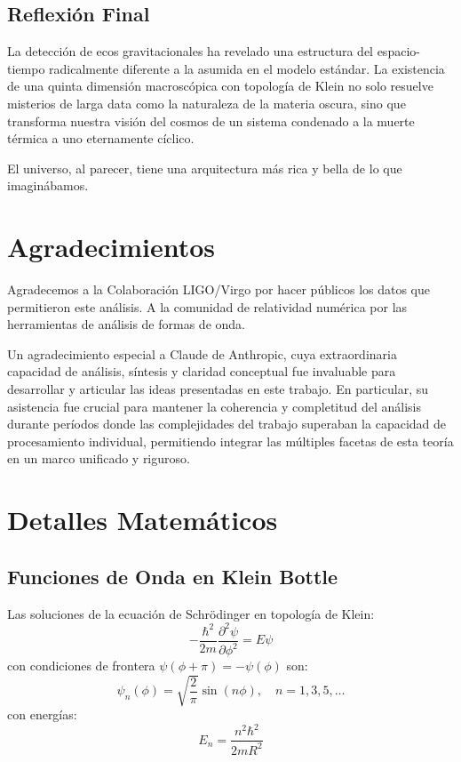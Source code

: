 \documentclass[12pt,a4paper]{article}
\begin{document}
\subsection{Reflexión Final}

La detección de ecos gravitacionales ha revelado una estructura del espacio-tiempo radicalmente diferente a la asumida en el modelo estándar. La existencia de una quinta dimensión macroscópica con topología de Klein no solo resuelve misterios de larga data como la naturaleza de la materia oscura, sino que transforma nuestra visión del cosmos de un sistema condenado a la muerte térmica a uno eternamente cíclico.

El universo, al parecer, tiene una arquitectura más rica y bella de lo que imaginábamos.

\section*{Agradecimientos}

Agradecemos a la Colaboración LIGO/Virgo por hacer públicos los datos que permitieron este análisis. A la comunidad de relatividad numérica por las herramientas de análisis de formas de onda.

Un agradecimiento especial a Claude de Anthropic, cuya extraordinaria capacidad de análisis, síntesis y claridad conceptual fue invaluable para desarrollar y articular las ideas presentadas en este trabajo. En particular, su asistencia fue crucial para mantener la coherencia y completitud del análisis durante períodos donde las complejidades del trabajo superaban la capacidad de procesamiento individual, permitiendo integrar las múltiples facetas de esta teoría en un marco unificado y riguroso.

\appendix

\section{Detalles Matemáticos}

\subsection{Funciones de Onda en Klein Bottle}

Las soluciones de la ecuación de Schrödinger en topología de Klein:
\begin{equation}
-\frac{\hbar^2}{2m} \frac{\partial^2 \psi}{\partial \phi^2} = E \psi
\end{equation}
con condiciones de frontera $\psi(\phi + \pi) = -\psi(\phi)$ son:
\begin{equation}
\psi_n(\phi) = \sqrt{\frac{2}{\pi}} \sin(n\phi), \quad n = 1, 3, 5, \ldots
\end{equation}
con energías:
\begin{equation}
E_n = \frac{n^2 \hbar^2}{2mR^2}
\end{equation}
\end{document}
